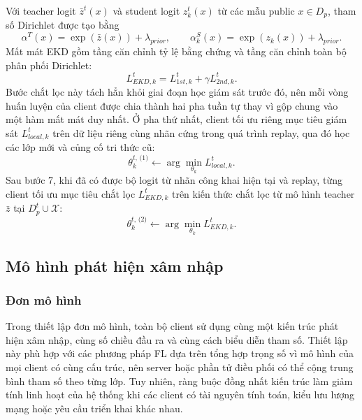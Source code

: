 Với teacher logit $\bar z^t(x)$ và student logit $z_k^t(x)$ từ các mẫu public $x \in D_p$, tham số Dirichlet được tạo bằng
\begin{equation}
\label{eq:dirichlet_evidence}
\alpha^T(x)=\exp(\bar z(x))+\lambda_{prior},
\qquad
\alpha_k^S(x)=\exp(z_k(x))+\lambda_{prior}.
\end{equation}
Mất mát EKD gồm tầng căn chỉnh tỷ lệ bằng chứng và tầng căn chỉnh toàn bộ phân phối Dirichlet:
\begin{equation}
\label{eq:ekd_loss}
L_{EKD,k}^t=L_{1st,k}^t+\gamma L_{2nd,k}^t.
\end{equation}
Bước chắt lọc này tách hẳn khỏi giai đoạn học giám sát trước đó, nên mỗi vòng huấn luyện của client được chia thành hai pha tuần tự thay vì gộp chung vào một hàm mất mát duy nhất. Ở pha thứ nhất, client tối ưu riêng mục tiêu giám sát $L_{local,k}^t$ trên dữ liệu riêng cùng nhãn cứng trong quá trình replay, qua đó học các lớp mới và củng cố tri thức cũ:
\begin{equation}
\label{eq:local_update}
\theta_k^{t,\,\text{(1)}}\leftarrow\arg\min_{\theta_k}L_{local,k}^t.
\end{equation}
Sau bước 7, khi đã có được bộ logit từ nhãn công khai hiện tại và replay, từng client tối ưu mục tiêu chắt lọc $L_{EKD,k}^t$ trên kiến thức chắt lọc từ mô hình teacher $\bar z$ tại $D_p^t \cup \mathcal X$:
\begin{equation}
\label{eq:ekd_update}
\theta_k^{t,\,\text{(2)}}\leftarrow\arg\min_{\theta_k}L_{EKD,k}^t.
\end{equation}

\subsection{Mô hình phát hiện xâm nhập}

\subsubsection{Đơn mô hình}

Trong thiết lập đơn mô hình, toàn bộ client sử dụng cùng một kiến trúc phát hiện xâm nhập, cùng số chiều đầu ra và cùng cách biểu diễn tham số. Thiết lập này phù hợp với các phương pháp FL dựa trên tổng hợp trọng số vì mô hình của mọi client có cùng cấu trúc, nên server hoặc phần tử điều phối có thể cộng trung bình tham số theo từng lớp. Tuy nhiên, ràng buộc đồng nhất kiến trúc làm giảm tính linh hoạt của hệ thống khi các client có tài nguyên tính toán, kiểu lưu lượng mạng hoặc yêu cầu triển khai khác nhau.

